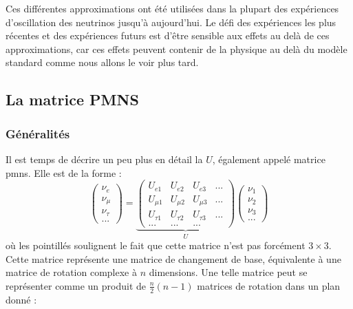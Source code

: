             Ces différentes approximations ont été utilisées dans la plupart des expériences d'oscillation des neutrinos jusqu'à aujourd'hui. Le défi des expériences les plus récentes et des expériences futurs est d'être sensible aux effets au delà de ces approximations, car ces effets peuvent contenir de la physique au delà du modèle standard comme nous allons le voir plus tard.
            
        \subsection{La matrice PMNS}\label{sec::pmns}
            \subsubsection{Généralités}
            Il est temps de décrire un peu plus en détail la $U$, également appelé matrice \gls{pmns}. Elle est de la forme : 
            \begin{equation}
                \left(\begin{matrix}
                     \nu_e \\ \nu_{\mu} \\ \nu_{\tau} \\ ...
                \end{matrix}\right) =
                \underbrace{\left(\begin{matrix}
                    U_{e1} & U_{e2} & U_{e3} & ... \\
                    U_{\mu 1} & U_{\mu 2} & U_{\mu 3} & ... \\
                    U_{\tau 1} & U_{\tau 2} & U_{\tau 3} & ... \\
                    ... & ... & ... &
                \end{matrix}\right)}_U
                \left(\begin{matrix}
                     \nu_1 \\ \nu_2 \\ \nu_3 \\ ...
                \end{matrix}\right)
            \end{equation}
            où les pointillés soulignent le fait que cette matrice n'est pas forcément $3\times 3$. Cette matrice représente une matrice de changement de base, équivalente à une matrice de rotation complexe à $n$ dimensions. Une telle matrice peut se représenter comme un produit de $\frac{n}{2}(n-1)$ matrices de rotation dans un plan donné\cite{Valle2006,Harari1986} : 
